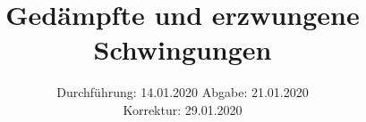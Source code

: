 

\subject{Versuchsnummer: 354}
\title{Gedämpfte und erzwungene Schwingungen}
\date{%
  Durchführung: 14.01.2020
  \hspace{3em}
  Abgabe: 21.01.2020\\
  \hspace{15em}
  Korrektur: 29.01.2020 
}



\maketitle
\thispagestyle{empty}
\tableofcontents
\newpage




\newpage
\nocite{*}
\printbibliography




